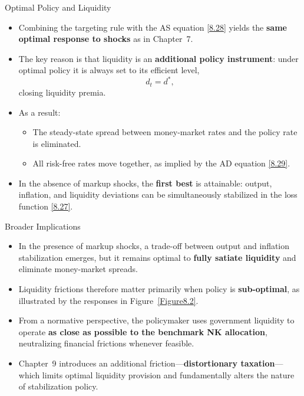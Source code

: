\documentclass[11pt,aspectratio=169]{beamer}
\begin{document}
\begin{frame}{Optimal Policy and Liquidity}
\small
\begin{itemize}
  \item Combining the targeting rule with the AS equation \eqref{8.28} yields
  the \textbf{same optimal response to shocks} as in Chapter~7.
  \vspace{0.4em}

  \item The key reason is that liquidity is an \textbf{additional policy instrument}:
  under optimal policy it is always set to its efficient level,
  \[
    d_t = d^*,
  \]
  closing liquidity premia.
  \vspace{0.4em}

  \item As a result:
  \begin{itemize}
    \item The steady-state spread between money-market rates and the policy rate is eliminated.
    \item All risk-free rates move together, as implied by the AD equation \eqref{8.29}.
  \end{itemize}
  \vspace{0.4em}

  \item In the absence of markup shocks, the \textbf{first best} is attainable:
  output, inflation, and liquidity deviations can be simultaneously stabilized
  in the loss function \eqref{8.27}.
\end{itemize}
\end{frame}

\begin{frame}{Broader Implications}
\small
\begin{itemize}
  \item In the presence of markup shocks, a trade-off between output and inflation stabilization emerges,
  but it remains optimal to \textbf{fully satiate liquidity} and eliminate money-market spreads.
  \vspace{0.3em}

  \item Liquidity frictions therefore matter primarily when policy is \textbf{sub-optimal},
  as illustrated by the responses in Figure~\ref{Figure8.2}.
  \vspace{0.3em}

  \item From a normative perspective, the policymaker uses government liquidity
  to operate \textbf{as close as possible to the benchmark NK allocation},
  neutralizing financial frictions whenever feasible.
  \vspace{0.3em}

  \item Chapter~9 introduces an additional friction—\textbf{distortionary taxation}—
  which limits optimal liquidity provision and fundamentally alters the nature
  of stabilization policy.
\end{itemize}
\end{frame}
\end{document}

